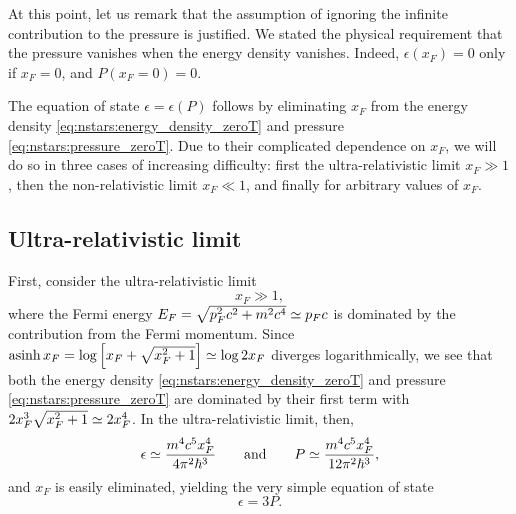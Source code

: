 At this point, let us remark that the assumption of ignoring the infinite contribution to the pressure is justified.
We stated the physical requirement that the pressure vanishes when the energy density vanishes.
Indeed, $\epsilon(x_F) = 0$ only if $x_F = 0$, and $P(x_F=0) = 0$.

The equation of state $\epsilon = \epsilon(P)$ follows by eliminating $x_F$ from the energy density \eqref{eq:nstars:energy_density_zeroT} and pressure \eqref{eq:nstars:pressure_zeroT}.
Due to their complicated dependence on $x_F$, we will do so in three cases of increasing difficulty: first the ultra-relativistic limit $x_F \gg 1$, then the non-relativistic limit $x_F \ll 1$, and finally for arbitrary values of $x_F$.

\subsection{Ultra-relativistic limit}
\label{sec:nstars:ur_limit}

First, consider the ultra-relativistic limit
\begin{equation}
	x_F \gg 1 , 
\label{eq:nstars:ur_limit}
\end{equation}
where the Fermi energy $E_F = \sqrt{p_F^2 c^2 + m^2 c^4} \simeq p_F c$ is dominated by the contribution from the Fermi momentum.
Since $\operatorname{asinh} x_F = \log \left[ x_F + \sqrt{x_F^2 + 1} \right] \simeq \log 2 x_F$ diverges logarithmically, we see that both the energy density \eqref{eq:nstars:energy_density_zeroT} and pressure \eqref{eq:nstars:pressure_zeroT} are dominated by their first term with $2 x_F^3 \sqrt{x_F^2 + 1} \simeq 2 x_F^4$.
In the ultra-relativistic limit, then,
\begin{equation}
	\epsilon \simeq \frac{m^4 c^5 x_F^4}{4 \pi^2 \hbar^3}
	\qquad \text{and} \qquad
	P        \simeq \frac{m^4 c^5 x_F^4}{12 \pi^2 \hbar^3},
\end{equation}
and $x_F$ is easily eliminated, yielding the very simple equation of state
\begin{equation}
	\epsilon = 3 P .
\label{eq:nstars:ur_eos}
\end{equation}

